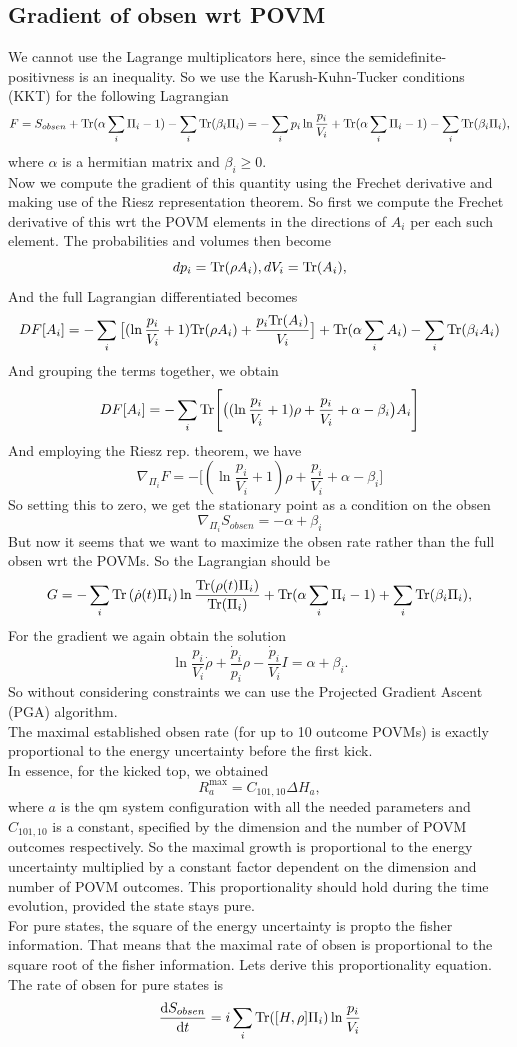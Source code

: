 \documentclass{article}
\begin{document}
\subsection{Gradient of obsen wrt POVM}
We cannot use the Lagrange multiplicators here, since the semidefinite-positivness is an inequality. So we use the Karush-Kuhn-Tucker conditions (KKT) for the following Lagrangian
\[
    F = S_{obsen} + \text{Tr}(\alpha\sum_i\Pi_i-1) - \sum_i\text{Tr}(\beta_i \Pi_i) = -\sum_ip_i\ln\frac{p_i}{V_i}+ \text{Tr}(\alpha\sum_i\Pi_i-1) - \sum_i\text{Tr}(\beta_i \Pi_i),
\]
where $\alpha$ is a hermitian matrix and $\beta_i \geq 0$. \\
Now we compute the gradient of this quantity using the Frechet derivative and making use of the Riesz representation theorem. So first we compute the Frechet derivative of this wrt the POVM elements in the directions of $A_i$ per each such element. The probabilities and volumes then become
\[
    dp_i = \text{Tr}(\rho A_i), dV_i = \text{Tr}(A_i),
\]
And the full Lagrangian differentiated becomes
\[
    DF[A_i] = -\sum_i\big[(\ln\frac{p_i}{V_i} + 1)\text{Tr}(\rho A_i) + \frac{p_i\text{Tr}(A_i)}{V_i}\big] + \text{Tr}(\alpha\sum_iA_i) - \sum_i\text{Tr}(\beta_iA_i)
\]
And grouping the terms together, we obtain
\[
    DF[A_i] = -\sum_i\text{Tr}\Bigg[\big((\ln\frac{p_i}{V_i} + 1)\rho + \frac{p_i}{V_i} + \alpha - \beta_i\big)A_i\Bigg]
\]
And employing the Riesz rep. theorem, we have
\[
    \nabla_{\Pi_i} F = -\Bigg[(\ln\frac{p_i}{V_i} + 1)\rho + \frac{p_i}{V_i} + \alpha - \beta_i\Bigg]
\]
So setting this to zero, we get the stationary point as a condition on the obsen
\[
    \nabla_{\Pi_i}S_{obsen} = -\alpha + \beta_i
\]
But now it seems that we want to maximize the obsen rate rather than the full obsen wrt the POVMs. So the Lagrangian should be 
\[
    G = -\sum_i \text{Tr}\left(\dot\rho(t)\Pi_i\right)\ln\frac{\text{Tr}(\rho(t)\Pi_i)}{\text{Tr}(\Pi_i)} + \text{Tr}(\alpha\sum_i\Pi_i-1) + \sum_i\text{Tr}(\beta_i \Pi_i),
\]
For the gradient we again obtain the solution
\[
    \ln\frac{p_i}{V_i}\dot\rho+\frac{\dot p_i}{p_i}\rho-\frac{\dot p_i}{V_i}I=\alpha+\beta_i.
\]
So without considering constraints we can use the Projected Gradient Ascent (PGA) algorithm. \\
The maximal established obsen rate (for up to 10 outcome POVMs) is exactly proportional to the energy uncertainty before the first kick. \\
In essence, for the kicked top, we obtained
\[
    R_a^{\max}=C_{101,10}\Delta H_a, 
\]
where $a$ is the qm system configuration with all the needed parameters and $C_{101,10}$ is a constant, specified by the dimension and the number of POVM outcomes respectively. So the maximal growth is proportional to the energy uncertainty multiplied by a constant factor dependent on the dimension and number of POVM outcomes. This proportionality should hold during the time evolution, provided the state stays pure.\\
For pure states, the square of the energy uncertainty is propto the fisher information. That means that the maximal rate of obsen is proportional to the square root of the fisher information. Lets derive this proportionality equation. The rate of obsen for pure states is 
\[
    \odv{S_{obsen}}{t} = i\sum_i \Tr([H, \rho]\Pi_i)\ln\frac{p_i}{V_i}
\]
\end{document}
